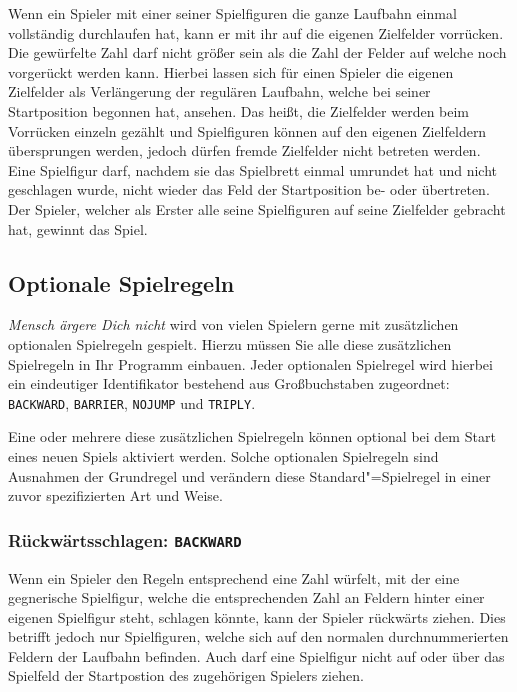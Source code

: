 Wenn ein Spieler mit einer seiner Spielfiguren die ganze Laufbahn einmal vollständig durchlaufen hat, kann er mit ihr auf die eigenen Zielfelder vorrücken. Die gewürfelte Zahl darf nicht größer sein als die Zahl der Felder auf welche noch vorgerückt werden kann. Hierbei lassen sich für einen Spieler die eigenen Zielfelder als Verlängerung der regulären Laufbahn, welche bei seiner Startposition begonnen hat, ansehen. Das heißt, die Zielfelder werden beim Vorrücken einzeln gezählt und Spielfiguren können auf den eigenen Zielfeldern übersprungen werden, jedoch dürfen fremde Zielfelder nicht betreten werden. Eine Spielfigur darf, nachdem sie das Spielbrett einmal umrundet hat und nicht geschlagen wurde, nicht wieder das Feld der Startposition be- oder übertreten. Der Spieler, welcher als Erster alle seine Spielfiguren auf seine Zielfelder gebracht hat, gewinnt das Spiel. 

\subsection*{Optionale Spielregeln}
\emph{Mensch ärgere Dich nicht} wird von vielen Spielern gerne mit zusätzlichen optionalen Spielregeln gespielt. Hierzu müssen Sie alle diese zusätzlichen Spielregeln in Ihr Programm einbauen. Jeder optionalen Spielregel wird hierbei ein eindeutiger Identifikator bestehend aus Großbuchstaben zugeordnet: \texttt{BACKWARD}, \texttt{BARRIER}, \texttt{NOJUMP} und \texttt{TRIPLY}.

Eine oder mehrere diese zusätzlichen Spielregeln können optional bei dem Start eines neuen Spiels aktiviert werden. Solche optionalen Spielregeln sind Ausnahmen der Grundregel und verändern diese Standard"=Spielregel in einer zuvor spezifizierten Art und Weise.
%


\subsubsection*{Rückwärtsschlagen: \texttt{BACKWARD}} 
Wenn ein Spieler den Regeln entsprechend eine Zahl würfelt, mit der eine gegnerische Spielfigur, welche die entsprechenden Zahl an Feldern hinter einer eigenen Spielfigur steht, schlagen könnte, kann der Spieler rückwärts ziehen. Dies betrifft jedoch nur Spielfiguren, welche sich auf den normalen durchnummerierten Feldern der Laufbahn befinden. Auch darf eine Spielfigur nicht auf oder über das Spielfeld der Startpostion des zugehörigen Spielers ziehen.

